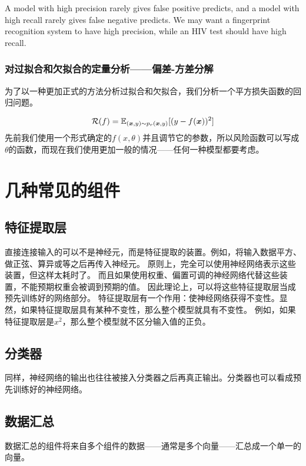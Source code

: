 \documentclass[UTF8, a4paper]{ctexart}
\begin{document}
A model with high precision rarely gives false positive predicts, and a model with high recall rarely gives false negative predicts. We may want a fingerprint recognition system to have high precision, while an HIV test should have high recall.

\hypertarget{sec:bias-and-variance}{%
\subsubsection{对过拟合和欠拟合的定量分析——偏差-方差分解}\label{sec:bias-and-variance}}

为了以一种更加正式的方法分析过拟合和欠拟合，我们分析一个平方损失函数的回归问题。

\[
\mathcal{R}(f) = \mathbb{E}_{(\vb*{x}, y)\sim p_r(\vb*{x}, y)}[(y-f(\vb*{x}))^2]
\]
先前我们使用一个形式确定的$f(x, \theta)$并且调节它的参数，所以风险函数可以写成$\theta$的函数，而现在我们使用更加一般的情况——任何一种模型都要考虑。

\section{几种常见的组件}

\subsection{特征提取层}

直接连接输入的可以不是神经元，而是特征提取的装置。例如，将输入数据平方、做正弦、算异或等之后再传入神经元。
原则上，完全可以使用神经网络表示这些装置，但这样太耗时了。
而且如果使用权重、偏置可调的神经网络代替这些装置，不能预期权重会被调到预期的值。
因此理论上，可以将这些特征提取层当成预先训练好的网络部分。
特征提取层有一个作用：使神经网络获得不变性。显然，如果特征提取层具有某种不变性，那么整个模型就具有不变性。
例如，如果特征提取层是$x^2$，那么整个模型就不区分输入值的正负。

\subsection{分类器}

同样，神经网络的输出也往往被接入分类器之后再真正输出。分类器也可以看成预先训练好的神经网络。

\subsection{数据汇总}
数据汇总的组件将来自多个组件的数据——通常是多个向量——汇总成一个单一的向量。
\end{document}

